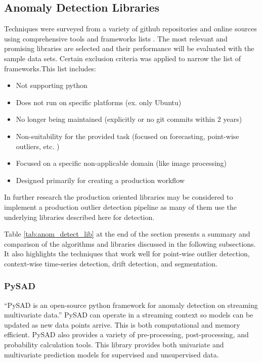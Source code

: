 \subsection{Anomaly Detection Libraries}
\label{ref_code_libraries}
 Techniques were surveyed from a variety of github repositories and online sources using comprehensive tools and frameworks lists \parencite{medico2020-ts-list}. The most relevant and promising libraries are selected and their performance will be evaluated with the sample data sets. Certain exclusion criteria was applied to narrow the list of frameworks.This list includes:
 \begin{itemize}
     \item Not supporting python
     \item Does not run on specific platforms (ex. only Ubuntu)
     \item No longer being maintained (explicitly or no git commits within 2 years)
     \item Non-suitability for the provided task (focused on forecasting, point-wise outliers, etc. )
     \item Focused on a specific non-applicable domain (like image processing)
     \item Designed primarily for creating a production workflow

 \end{itemize}
 In further research the production oriented libraries may be considered to implement a production outlier detection pipeline as many of them use the underlying libraries described here for detection. 
 
 Table \ref{tab:anom_detect_lib} at the end of the section presents a summary and comparison of the algorithms and libraries discussed in the following subsections. It also highlights the techniques that work well for point-wise outlier detection, context-wise time-series detection, drift detection, and segmentation. 

\subsubsection{PySAD}

\enquote{PySAD is an open-source python framework for anomaly detection on streaming multivariate data.} \parencite{pysad} PySAD can operate in a streaming context so models can be updated as new data points arrive. This is both computational and memory efficient. PySAD also provides a variety of pre-processing, post-processing, and probability calculation tools. This library provides both univariate and multivariate prediction models for supervised and unsupervised data. 

